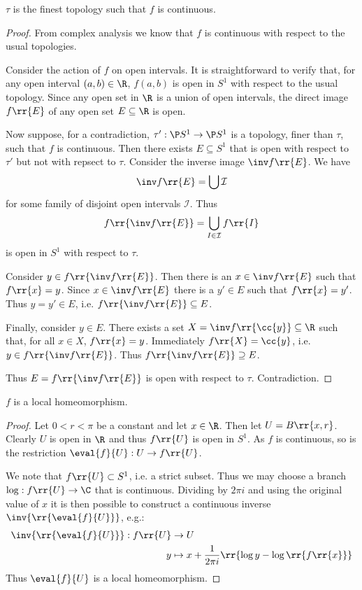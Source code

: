 \documentclass{article}
\begin{document}
\begin{claim*}
	$\tau$ is the finest topology such that $f$ is continuous.
	\begin{proof}
		From complex analysis we know that $f$ is continuous with respect to the usual topologies.

		Consider the action of $f$ on open intervals. It is straightforward to verify that,
		for any open interval $(a,b)\in\R$, $f(a,b)$ is open in $S^1$ with respect to the
		usual topology. Since any open set in $\R$ is a union of open intervals, the direct
		image $f\rr{E}$ of any open set $E\subseteq\R$ is open.

		Now suppose, for a contradiction, $\tau':\P S^1 \to \P S^1$ is a topology, finer than
		$\tau$, such that
		$f$ is continuous. Then there exists $E\subseteq S^1$ that is open with respect to
		$\tau'$ but not with repsect to $\tau$. Consider the inverse image $\inv f\rr{E}$.
		We have
		\begin{align*}
			\inv f\rr{E} = \bigcup\mathcal I
		\end{align*}
		for some family of disjoint open intervals $\mathcal I$. Thus
		\begin{align*}
			f\rr{\inv f\rr{E}}=\bigcup_{I\in\mathcal I} f\rr{I}
		\end{align*}
		is open in $S^1$ with respect to $\tau$.

		Consider $y\in f\rr{\inv f\rr{E}}$.
		Then there is an $x\in \inv f\rr{E}$ such that $f\rr{x}=y$. Since $x\in\inv f\rr{E}$
		there is a $y'\in E$ such that $f\rr{x}=y'$. Thus $y=y'\in E$, i.e. $f\rr{\inv f\rr{E}}\subseteq E$.

		Finally, consider $y\in E$. There exists a set $X=\inv f\rr{\cc{y}}\subseteq\R$ such that,
		for all $x\in X$, $f\rr{x}=y$. Immediately $f\rr{X}=\cc{y}$, i.e. $y\in f\rr{\inv f\rr{E}}$.
		Thus $f\rr{\inv f\rr{E}}\supseteq E$.

		Thus $E=f\rr{\inv f\rr{E}}$ is open with respect to $\tau$. Contradiction.
	\end{proof}
\end{claim*}

\begin{claim*}
	$f$ is a local homeomorphism.
	\begin{proof}
		Let $0<r<\pi$ be a constant and let $x\in\R$. Then let $U=B\rr{x,r}$. Clearly
		$U$ is open in $\R$ and thus $f\rr{U}$ is open in $S^1$. As $f$ is continuous, so
		is the restriction $\eval{f}{U}:U\to f\rr{U}$.

		We note that $f\rr{U}\subset S^1$, i.e. a strict subset. Thus we may choose a branch
		$\log:f\rr{U}\to\C$ that is continuous. Dividing by $2\pi i$ and using the original value
		of $x$ it is then possible to construct a continuous inverse $\inv{\rr{\eval{f}{U}}}$, e.g.:
		\begin{align*}
			\inv{\rr{\eval{f}{U}}}:f\rr{U} & \to U                                                  \\
			y                              & \mapsto x+\frac{1}{2\pi i}\rr{\log y-\log\rr{f\rr{x}}}
		\end{align*}
		Thus $\eval{f}{U}$ is a local homeomorphism.
	\end{proof}
\end{claim*}
\end{document}
